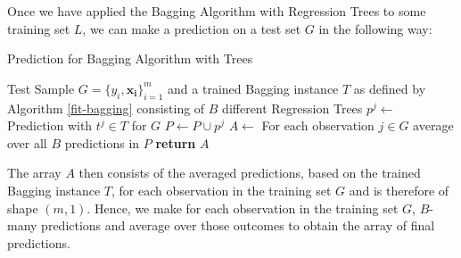 Once we have applied the Bagging Algorithm with Regression Trees to some training set $L$, we can make a prediction on a test set $G$ in the following way:

\begin{algorithm}
  \caption{Prediction for Bagging Algorithm with Trees}
  \label{predict-bagging}
  \begin{algorithmic}[1] %
    \Require Test Sample $G = \{y_{i},\mathbf{x_{i}} \}_{i=1}^{m}$ and a trained Bagging instance $T$ as defined by Algorithm \ref{fit-bagging} consisting of $B$ different Regression Trees
      \State $p^j \gets$ Prediction with $t^j \in T$ for $G$
      \State $P \gets P \cup p^j$
      \EndFor
      \State $A \gets$ For each observation $j \in G$ average over all $B$ predictions in $P$
      \State \textbf{return} $A$
    \EndFunction

  \end{algorithmic}
\end{algorithm}

The array $A$ then consists of the averaged predictions, based on the trained Bagging instance $T$, for each observation in the training set $G$ and is therefore of shape $(m,1)$. Hence, we make for each observation in the training set $G$, $B$-many predictions and average over those outcomes to obtain the array of final predictions.

